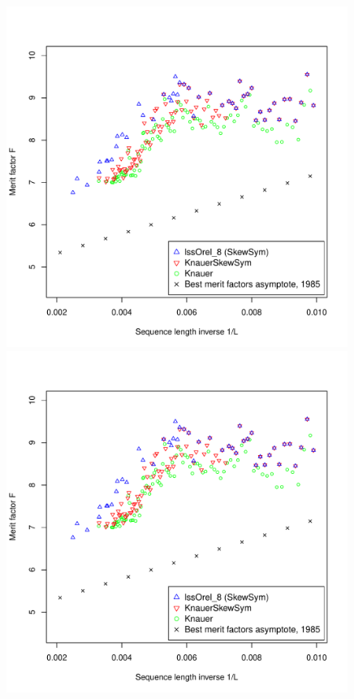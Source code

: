 \begin{figure}[t!]
\begin{minipage}{0.49\textwidth}
\vspace*{-5ex}%
\end{minipage}
~%
\begin{minipage}{0.49\textwidth}
\includegraphics[width=0.99\textwidth]{fg-R-labs-wide-4-figures-c}
\vspace*{-5ex}%
\end{minipage}
%
\begin{minipage}{0.49\textwidth}
\includegraphics[width=0.99\textwidth]{fg-R-labs-wide-4-figures-c}

\end{minipage}
\end{figure}
